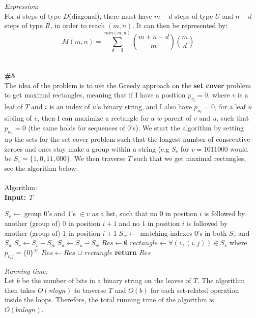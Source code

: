 \documentclass{article}
\begin{document}
\textit{Expression}:\\
For $d$ steps of type $D$(diagonal), there must have $m - d$ steps of type $U$ and $n - d$ steps of type $R$, in order to reach $(m, n)$. It can then be represented by:\\
$$M(m, n) = \sum_{d=0}^{min(m, n)} {m + n - d \choose m} {m \choose d} $$\\\\
\textbf{\#5}\\
The idea of the problem is to use the Greedy approach on the \textbf{set cover} problem to get maximal rectangles, meaning that if I have a position $p_{v_i} = 0$, where $v$ is a leaf of $T$ and $i$ is an index of $u$'s binary string, and I also have $p_{u_i} = 0$, for a leaf $u$ sibling of $v$, then I can maximize a rectangle for a $w$ parent of $v$ and $u$, such that $p_{w_i} = 0$ (the same holds for sequences of $0$'s). We start the algorithm by setting up the sets for the set cover problem such that the longest number of consecutive zeroes and ones stay make a group within a string (e.g $S_v$ for $v = 1011000$ would be $S_v = \{1, 0, 11, 000\}$. We then traverse $T$ such that we get maximal rectangles, see the algorithm below: \\\\
Algorithm:\\
\textbf{Input:} \textit{T}
\begin{algorithmic}
  \State $S_v \gets$ group $0$'s and $1$'s $\in v$ as a list, such that no $0$ in position $i$ is followed by another (group of) $0$ in position $i+1$ and no $1$ in position $i$ is followed by another (group of) $1$ in position $i+1$
\EndFor
{}
  \State $S_w \gets$ matching-indexes $0$'s in both $S_v$ and $S_u$
  \State $S_v \gets S_v - S_w$
  \State $S_u \gets S_u - S_w$ 
\EndFor
\State $Res \gets \emptyset$
    \State $rectangle \gets \forall(v, (i, j)) \in S_v$ where $p_{v_ij} = \{0\}^{|v|}$
    \State $Res \gets Res$ $\cup$ $rectangle$
  \EndIf
\EndFor
\State \textbf{return} $Res$\\
\end{algorithmic}
\textit{Running time:}\\
Let $b$ be the number of bits in a binary string on the leaves of $T$. The algorithm then takes $O(nlogn)$ to traverse $T$ and $O(b)$ for each set-related operation inside the loops. Therefore, the total running time of the algorithm is $O(bnlogn)$.
\end{document}
